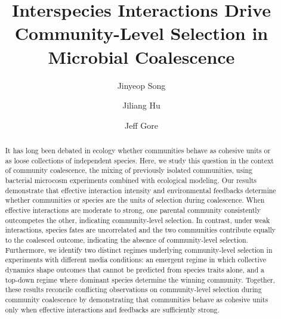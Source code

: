 
\title{Interspecies Interactions Drive Community-Level Selection in Microbial Coalescence}




\author[1]{Jinyeop Song}
\author[1]{Jiliang Hu}
\author[1]{Jeff Gore}


\date{}

\maketitle

\begin{abstract}
It has long been debated in ecology whether communities behave as cohesive units or as loose collections of independent species. Here, we study this question in the context of community coalescence, the mixing of previously isolated communities, using bacterial microcosm experiments combined with ecological modeling. Our results demonstrate that effective interaction intensity and environmental feedbacks determine whether communities or species are the units of selection during coalescence. When effective interactions are moderate to strong, one parental community consistently outcompetes the other, indicating community-level selection. In contrast, under weak interactions, species fates are uncorrelated and the two communities contribute equally to the coalesced outcome, indicating the absence of community-level selection.  Furthermore, we identify two distinct regimes underlying community-level selection in experiments with different media conditions: an emergent regime in which collective dynamics shape outcomes that cannot be predicted from species traits alone, and a top-down regime where dominant species determine the winning community. Together, these results reconcile conflicting observations on community-level selection during community coalescence by demonstrating that communities behave as cohesive units only when effective interactions and feedbacks are sufficiently strong.
\end{abstract}

\newpage
